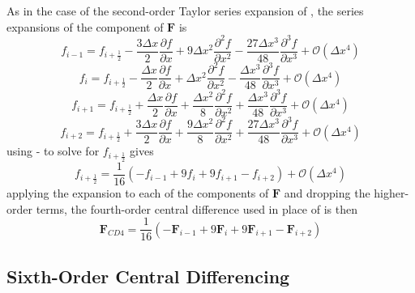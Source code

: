 As in the case of the second-order Taylor series expansion of , the series expansions of the component of $\boldsymbol{F}$ is
\begin{equation}\label{eqn:fim1CD4}
	f_{i-1} = f_{i+\frac{1}{2}} - \frac{3 \Delta x}{2} \frac{\partial f}{\partial x} + 9 \Delta x^2 \frac{\partial^2 f}{\partial x^2} - \frac{27 \Delta x^3}{48} \frac{\partial^3 f}{\partial x^3} + \mathcal{O}\left(\Delta x^4\right)
\end{equation}
\begin{equation}
	f_{i} = f_{i+\frac{1}{2}} - \frac{\Delta x}{2} \frac{\partial f}{\partial x} + \Delta x^2 \frac{\partial^2 f}{\partial x^2} - \frac{ \Delta x^3}{48} \frac{\partial^3 f}{\partial x^3} + \mathcal{O}\left(\Delta x^4\right)
\end{equation}
\begin{equation}
	f_{i+1} = f_{i+\frac{1}{2}} + \frac{\Delta x}{2} \frac{\partial f}{\partial x} + \frac{\Delta x^2}{8} \frac{\partial^2 f}{\partial x^2} + \frac{\Delta x^3}{48} \frac{\partial^3 f}{\partial x^3} + \mathcal{O}\left(\Delta x^4\right)
\end{equation}
\begin{equation}\label{eqn:fip2CD4}
	f_{i+2} = f_{i+\frac{1}{2}} + \frac{3 \Delta x}{2} \frac{\partial f}{\partial x} + \frac{9 \Delta x^2}{8} \frac{\partial^2 f}{\partial x^2} + \frac{27 \Delta x^3}{48} \frac{\partial^3 f}{\partial x^3} + \mathcal{O}\left(\Delta x^4\right)
\end{equation}
using - to solve for $f_{i+\frac{1}{2}}$ gives
\begin{equation}
	f_{i+\frac{1}{2}} = \frac{1}{16} \left(- f_{i-1} + 9 f_i + 9 f_{i+1} - f_{i+2}\right) + \mathcal{O}\left(\Delta x^4\right)
\end{equation}
applying the expansion to each of the components of $\boldsymbol{F}$ and dropping the higher-order terms, the fourth-order central difference used in place of  is then
\begin{equation}\label{eqn:CD4}
	\boldsymbol{F}_{CD4} = \frac{1}{16} \left(- \boldsymbol{F}_{i-1} + 9 \boldsymbol{F}_i + 9 \boldsymbol{F}_{i+1} - \boldsymbol{F}_{i+2}\right)
\end{equation}
\subsection{Sixth-Order Central Differencing}

